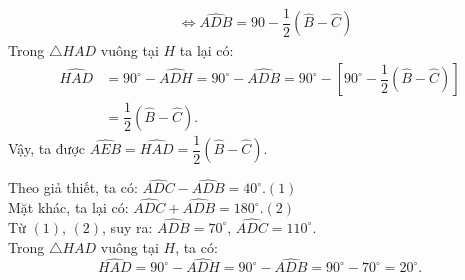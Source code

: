 \begin{vd}
{\begin{listEX}
$$\begin{aligned}
		&\Leftrightarrow \widehat{ADB}=90-\dfrac{1}{2}(\widehat{B}-\widehat{C})
		\end{aligned}$$
		Trong $\triangle HAD$ vuông tại $H$ ta lại có:
		$$\begin{aligned}
		\widehat{HAD}&=90^\circ-\widehat{ADH}=90^\circ-\widehat{ADB}=90^\circ-\left[90^\circ-\dfrac{1}{2}(\widehat{B}-\widehat{C})\right]\\
		&=\dfrac{1}{2}(\widehat{B}-\widehat{C}).
		\end{aligned}$$
		Vậy, ta được $\widehat{AEB}=\widehat{HAD}=\dfrac{1}{2}(\widehat{B}-\widehat{C})$.
		\item Theo giả thiết, ta có: $\widehat{ADC}-\widehat{ADB}=40^\circ$.\qquad $(1)$\\
		Mặt khác, ta lại có: $\widehat{ADC}+\widehat{ADB}=180^\circ$.\qquad $(2)$\\
		Từ $(1)$, $(2)$, suy ra: $\widehat{ADB}=70^\circ$, $\widehat{ADC}=110^\circ$.\\
		Trong $\triangle HAD$ vuông tại $H$, ta có:
		$$\widehat{HAD}=90^\circ-\widehat{ADH}=90^\circ-\widehat{ADB}=90^\circ-70^\circ=20^\circ.$$
	\end{listEX}
}
\end{vd}
